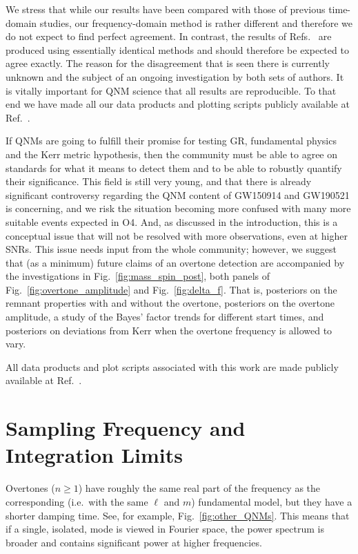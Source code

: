 We stress that while our results have been compared with those of previous time-domain studies, our frequency-domain method is rather different and therefore we do not expect to find perfect agreement. 
In contrast, the results of Refs.~\cite{Isi:2019aib, Cotesta:2022pci, Isi:2022mhy} are produced using essentially identical methods and should therefore be expected to agree exactly. 
The reason for the disagreement that is seen there is currently unknown and the subject of an ongoing investigation by both sets of authors.
It is vitally important for QNM science that all results are reproducible. To that end we have made all our data products and plotting scripts publicly available at Ref.~\cite{finch_eliot_zenodo}.

If QNMs are going to fulfill their promise for testing GR, fundamental physics and the Kerr metric hypothesis, then the community must be able to agree on standards for what it means to detect them and to be able to robustly quantify their significance. 
This field is still very young, and that there is already significant controversy regarding the QNM content of GW150914 and GW190521 is concerning, and we risk the situation becoming more confused with many more suitable events expected in O4.
And, as discussed in the introduction, this is a conceptual issue that will not be resolved with more observations, even at higher SNRs.
This issue needs input from the whole community; however, we suggest that (as a minimum) future claims of an overtone detection are accompanied by the investigations in Fig.~\ref{fig:mass_spin_post}, both panels of Fig.~\ref{fig:overtone_amplitude} and Fig.~\ref{fig:delta_f}.
That is, posteriors on the remnant properties with and without the overtone, posteriors on the overtone amplitude, a study of the Bayes' factor trends for different start times, and posteriors on deviations from Kerr when the overtone frequency is allowed to vary.

All data products and plot scripts associated with this work are made publicly available at Ref.~\cite{finch_eliot_zenodo}.


\section{Sampling Frequency and Integration Limits}\label{app:fhigh}

Overtones ($n \geq 1$) have roughly the same real part of the frequency as the corresponding (i.e.\ with the same $\ell$ and $m$) fundamental model, but they have a shorter damping time. 
See, for example, Fig.~\ref{fig:other_QNMs}. 
This means that if a single, isolated, mode is viewed in Fourier space, the power spectrum is broader and contains significant power at higher frequencies.


